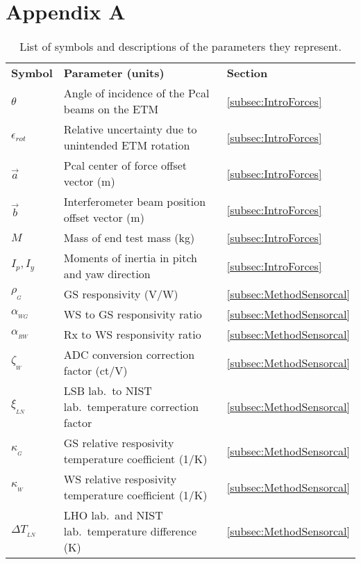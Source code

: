 \documentclass[12pt,a4paper,final]{iopart}
\begin{document}
 \section*{Appendix A}
\begin{table}[h]
\caption{List of symbols and descriptions of the parameters they represent.}
\vspace{0.1in}
\begin{indented}
    \item[]\begin{tabular}{L{1.3cm} L{8.8cm} C{1.2cm}}
        \Xhline{4\arrayrulewidth}
        \bf Symbol & \bf Parameter (units) & \bf Section  \\
        \Xhline{2\arrayrulewidth}
        $\theta$ & Angle of incidence of the Pcal beams on the ETM & \ref{subsec:IntroForces} \\
        $\epsilon_{rot}$ & Relative uncertainty due to unintended ETM rotation & \ref{subsec:IntroForces} \\
        $\vec{a}$ & Pcal center of force offset vector (m)& \ref{subsec:IntroForces} \\
        $\vec{b}$ & Interferometer beam position offset vector (m)& \ref{subsec:IntroForces} \\
        $M$ & Mass of end test mass (kg)& \ref{subsec:IntroForces} \\
        $I_p, I_y$ & Moments of inertia in pitch and yaw direction & \ref{subsec:IntroForces}\\
        $\rho_{_G}$ & GS responsivity  (V/W)   & \ref{subsec:MethodSensorcal} \\
        $\alpha_{_{WG}}$ & WS to GS responsivity ratio & \ref{subsec:MethodSensorcal}\\
        $\alpha_{_{RW}}$ & Rx to WS responsivity ratio & \ref{subsec:MethodSensorcal}\\
        $\zeta_{_W}$ & ADC conversion correction factor (ct/V) & \ref{subsec:MethodSensorcal} \\
        $\xi_{_{LN}}$ & LSB lab.\ to NIST lab.\ temperature correction factor & \ref{subsec:MethodSensorcal} \\
        $\kappa_{_G}$ & GS relative resposivity temperature coefficient (1/K) & \ref{subsec:MethodSensorcal} \\
        $\kappa_{_W}$ & WS relative resposivity temperature coefficient (1/K)  & \ref{subsec:MethodSensorcal} \\
        $\Delta T_{_{LN}}$ & LHO lab.\ and  NIST lab.\ temperature difference (K) & \ref{subsec:MethodSensorcal} \\

\end{tabular}
\end{indented}
\end{table}
\end{document}
